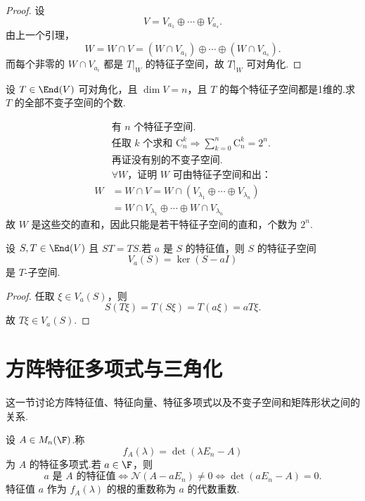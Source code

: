 \begin{proof}
	设
	\[
	V=V_{a_1}\oplus\cdots\oplus V_{a_s}.
	\]
	由上一个引理，
	\[
	W=W\cap V=(W\cap V_{a_1})\oplus\cdots\oplus(W\cap V_{a_s}).
	\]
	而每个非零的 $W\cap V_{a_i}$ 都是 $T|_W$ 的特征子空间，故 $T|_W$ 可对角化.
\end{proof}
\begin{example}
	设 $T \in \End(V)$ 可对角化，且 $\dim V = n$，且 $T$ 的每个特征子空间都是1维的.求 $T$ 的全部不变子空间的个数.
	
	
\end{example}
\begin{solution}
	\begin{align*}
		& \text{有 } n \text{ 个特征子空间}. \\
		& \text{任取 } k \text{ 个求和 } \mathrm{C}_n^k \Rightarrow \sum_{k=0}^n \mathrm{C}_n^k = 2^n. \\
		& \text{再证没有别的不变子空间}. \\
		& \forall W \text{，证明 } W \text{ 可由特征子空间和出：} \\
		W &= W \cap V = W \cap (V_{\lambda_1} \oplus \cdots \oplus V_{\lambda_n}) \\
		&= W \cap V_{\lambda_1} \oplus \cdots \oplus W \cap V_{\lambda_n}
	\end{align*}
	故 $W$ 是这些交的直和，因此只能是若干特征子空间的直和，个数为 $2^n$.
\end{solution}


\begin{example}
	设 $S,T\in\End(V)$ 且 $ST=TS$.若 $a$ 是 $S$ 的特征值，则 $S$ 的特征子空间
	\[
	V_a(S)=\ker(S-aI)
	\]
	是 $T$-子空间.
\end{example}

\begin{proof}
	任取 $\xi\in V_a(S)$，则
	\[
	S(T\xi)=T(S\xi)=T(a\xi)=aT\xi.
	\]
	故 $T\xi\in V_a(S)$.
\end{proof}

\section{方阵特征多项式与三角化}

这一节讨论方阵特征值、特征向量、特征多项式以及不变子空间和矩阵形状之间的关系.

\begin{definition}\label{p1:concept:c5-l495}
	设 $A\in M_n(\F)$.称
	\[
	f_A(\lambda)=\det(\lambda E_n-A)
	\]
	为 $A$ 的特征多项式.若 $a\in\F$，则
	\[
	a\text{ 是 }A\text{ 的特征值}
	\Longleftrightarrow
	\mathcal N(A-aE_n)\neq0
	\Longleftrightarrow
	\det(aE_n-A)=0.
	\]
	特征值 $a$ 作为 $f_A(\lambda)$ 的根的重数称为 $a$ 的代数重数.
\end{definition}

